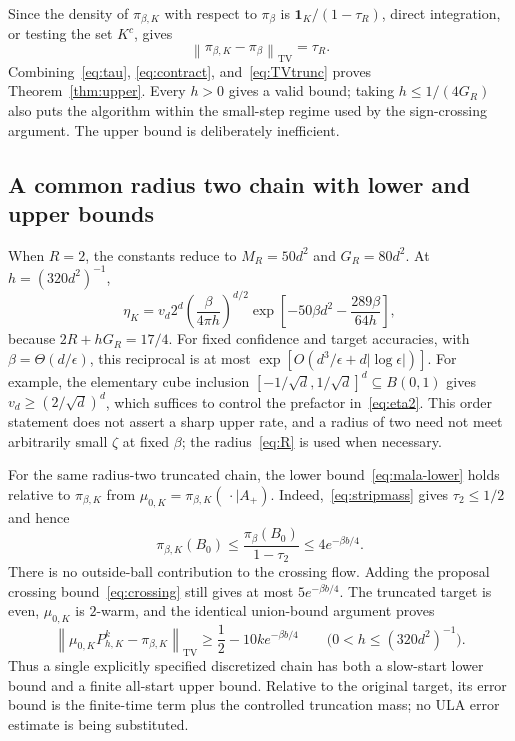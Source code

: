 \documentclass[11pt,letterpaper]{article}
\numberwithin{equation}{section}
\theoremstyle{remark}
\newcommand{\TV}{\mathrm{TV}}
\newcommand{\1}{\mathbf 1}
\newcommand{\norm}[1]{\left\lVert#1\right\rVert}
\newcommand{\abs}[1]{\left\lvert#1\right\rvert}
\begin{document}
Since the density of $\pi_{\beta,K}$ with respect to $\pi_\beta$ is $\1_K/(1-\tau_R)$, direct integration, or testing the set $K^c$, gives
\begin{equation}\label{eq:TVtrunc}
 \norm{\pi_{\beta,K}-\pi_\beta}_{\TV}=\tau_R.
\end{equation}
Combining~\eqref{eq:tau}, \eqref{eq:contract}, and~\eqref{eq:TVtrunc} proves Theorem~\ref{thm:upper}. Every $h>0$ gives a valid bound; taking $h\le1/(4G_R)$ also puts the algorithm within the small-step regime used by the sign-crossing argument. The upper bound is deliberately inefficient.

\subsection{A common radius two chain with lower and upper bounds}

When $R=2$, the constants reduce to $M_R=50d^2$ and $G_R=80d^2$. At $h=(320d^2)^{-1}$,
\begin{equation}\label{eq:eta2}
 \eta_K=v_d2^d\left(\frac\beta{4\pi h}\right)^{d/2}
 \exp\left[-50\beta d^2-\frac{289\beta}{64h}\right],
\end{equation}
because $2R+hG_R=17/4$. For fixed confidence and target accuracies, with $\beta=\Theta(d/\epsilon)$, this reciprocal is at most
$\exp[O(d^3/\epsilon+d\abs{\log\epsilon})]$.
For example, the elementary cube inclusion $[-1/\sqrt d,1/\sqrt d]^d\subseteq B(0,1)$ gives $v_d\ge(2/\sqrt d)^d$, which suffices to control the prefactor in~\eqref{eq:eta2}. This order statement does not assert a sharp upper rate, and a radius of two need not meet arbitrarily small $\zeta$ at fixed $\beta$; the radius~\eqref{eq:R} is used when necessary.

For the same radius-two truncated chain, the lower bound~\eqref{eq:mala-lower} holds relative to $\pi_{\beta,K}$ from
$\mu_{0,K}=\pi_{\beta,K}(\,\cdot\mid A_+)$. Indeed,~\eqref{eq:stripmass} gives $\tau_2\le1/2$ and hence
\[
 \pi_{\beta,K}(B_0)\le\frac{\pi_\beta(B_0)}{1-\tau_2}
 \le4e^{-\beta b/4}.
\]
There is no outside-ball contribution to the crossing flow. Adding the proposal crossing bound~\eqref{eq:crossing} still gives at most $5e^{-\beta b/4}$. The truncated target is even, $\mu_{0,K}$ is $2$-warm, and the identical union-bound argument proves
\begin{equation}\label{eq:trunclower}
 \norm{\mu_{0,K}P_{h,K}^k-\pi_{\beta,K}}_{\TV}
 \ge\frac12-10k e^{-\beta b/4}
 \qquad\bigl(0<h\le(320d^2)^{-1}\bigr).
\end{equation}
Thus a single explicitly specified discretized chain has both a slow-start lower bound and a finite all-start upper bound. Relative to the original target, its error bound is the finite-time term plus the controlled truncation mass; no ULA error estimate is being substituted.
\end{document}
